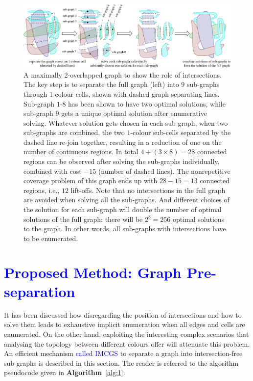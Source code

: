 \documentclass[journal]{IEEEtran}
\begin{document}
\begin{figure}[t]
\centering
\includegraphics[width=\textwidth]{figures/two_overlapped_graph_2}
\caption{
A maximally 2-overlapped graph to show the role of intersections. 
The key step is to separate the full graph (left) into $9$ sub-graphs through $1$-colour cells, shown with dashed graph separating lines. 
Sub-graph $1$-$8$ has been shown to have two optimal solutions, while sub-graph $9$ gets a unique optimal solution after enumerative solving. 
Whatever solution gets chosen in each sub-graph, when two sub-graphs are combined, the two $1$-colour sub-cells separated by the dashed line re-join together, resulting in a reduction of one on the number of continuous regions. 
In total $4+(3\times 8)=28$ connected regions can be observed after solving the sub-graphs individually, combined with cost $-15$ (number of dashed lines). The nonrepetitive coverage problem of this graph ends up with $28-15=13$ connected regions, i.e., $12$ lift-offs. 
Note that no intersections in the full graph are avoided when solving all the sub-graphs. And different choices of the solution for each sub-graph will double the number of optimal solutions of the full graph: there will be $2^8=256$ optimal solutions to the graph.
In other words, all sub-graphs with intersections have to be enumerated. 
}
\label{fig:two_overlapped_graph}
\end{figure}

\section{\textcolor{blue}{Proposed Method: Graph Pre-separation}}
\label{section_graph_separation}
It has been discussed how disregarding the position of intersections and how to solve them leads to exhaustive implicit enumeration when all edges and cells are enumerated. 
On the other hand, exploiting the interesting complex scenarios that analysing the topology between different colours offer will attenuate this problem. 
An efficient mechanism \textcolor{blue}{called IMCGS} to separate a graph into intersection-free sub-graphs is described in this section. 
The reader is referred to the algorithm pseudocode given in \textbf{Algorithm}~\ref{alg:1}.
\end{document}
